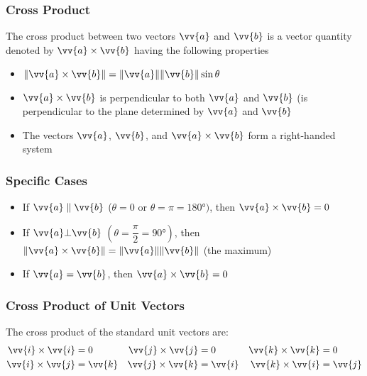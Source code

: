 \documentclass{article}
\newcommand{\mv}[1]{
	\lVert\vv{#1}\rVert
}
\begin{document}
	\subsubsection{Cross Product}
	The cross product between two vectors $\vv{a}$ and $\vv{b}$ is a vector quantity denoted by $\vv{a}\times\vv{b}$ having the following properties
	\begin{itemize}
		\item $\lVert\vv{a}\times\vv{b}\rVert=\mv{a}\mv{b}\sin\theta$
		\item $\vv{a}\times\vv{b}$ is perpendicular to both $\vv{a}$ and $\vv{b}$ (is perpendicular to the plane determined by $\vv{a}$ and $\vv{b}$
		\item The vectors $\vv{a}$, $\vv{b}$, and $\vv{a}\times\vv{b}$ form a right-handed system
	\end{itemize}
	\subsubsection{Specific Cases}
	\begin{itemize}
		\item If $\vv{a}\parallel\vv{b}$ ($\theta=0$ or $\theta=\pi=\ang{180})$, then $\vv{a}\times\vv{b}=0$
		\item If $\vv{a}\bot\vv{b}$ $\left(\theta=\dfrac{\pi}{2}=\ang{90}\right)$, then $\lVert\vv{a}\times\vv{b}\rVert=\mv{a}\mv{b}$ (the maximum)
		\item If $\vv{a}=\vv{b}$, then $\vv{a}\times\vv{b}=0$
	\end{itemize}
	\subsubsection{Cross Product of Unit Vectors}
	The cross product of the standard unit vectors are:
	\begin{align*}
		\vv{i}\times\vv{i}&=0&\vv{j}\times\vv{j}&=0&\vv{k}\times\vv{k}&=0\\
		\vv{i}\times\vv{j}&=\vv{k}&\vv{j}\times\vv{k}&=\vv{i}&\vv{k}\times\vv{i}&=\vv{j}
	\end{align*}
\end{document}
